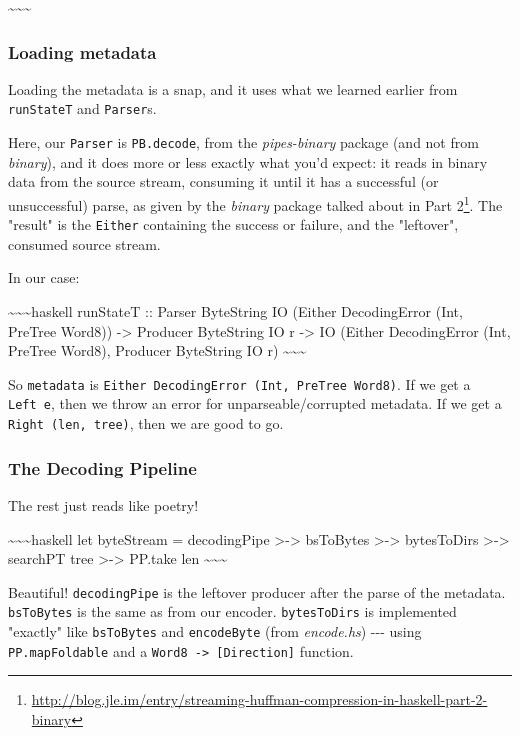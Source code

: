 \documentclass[]{article}
\renewcommand{\href}[2]{#2\footnote{\url{#1}}}
\begin{document}
\textasciitilde{}\textasciitilde{}\textasciitilde{}

\subsubsection{Loading metadata}

Loading the metadata is a snap, and it uses what we learned earlier from
\texttt{runStateT} and \texttt{Parser}s.

Here, our \texttt{Parser} is \texttt{PB.decode}, from the \emph{pipes-binary}
package (and not from \emph{binary}), and it does more or less exactly what
you'd expect: it reads in binary data from the source stream, consuming it until
it has a successful (or unsuccessful) parse, as given by the \emph{binary}
package talked about in
\href{http://blog.jle.im/entry/streaming-huffman-compression-in-haskell-part-2-binary}{Part
2}. The "result" is the \texttt{Either} containing the success or failure, and
the "leftover", consumed source stream.

In our case:

\textasciitilde{}\textasciitilde{}\textasciitilde{}haskell runStateT :: Parser
ByteString IO (Either DecodingError (Int, PreTree Word8)) -\textgreater{}
Producer ByteString IO r -\textgreater{} IO (Either DecodingError (Int, PreTree
Word8), Producer ByteString IO r)
\textasciitilde{}\textasciitilde{}\textasciitilde{}

So \texttt{metadata} is \texttt{Either\ DecodingError\ (Int,\ PreTree\ Word8)}.
If we get a \texttt{Left\ e}, then we throw an error for unparseable/corrupted
metadata. If we get a \texttt{Right\ (len,\ tree)}, then we are good to go.

\subsubsection{The Decoding Pipeline}

The rest just reads like poetry!

\textasciitilde{}\textasciitilde{}\textasciitilde{}haskell let byteStream =
decodingPipe \textgreater{}-\textgreater{} bsToBytes
\textgreater{}-\textgreater{} bytesToDirs \textgreater{}-\textgreater{} searchPT
tree \textgreater{}-\textgreater{} PP.take len
\textasciitilde{}\textasciitilde{}\textasciitilde{}

Beautiful! \texttt{decodingPipe} is the leftover producer after the parse of the
metadata. \texttt{bsToBytes} is the same as from our encoder.
\texttt{bytesToDirs} is implemented "exactly" like \texttt{bsToBytes} and
\texttt{encodeByte} (from \emph{encode.hs}) -\/-\/- using
\texttt{PP.mapFoldable} and a \texttt{Word8\ -\textgreater{}\ {[}Direction{]}}
function.
\end{document}

